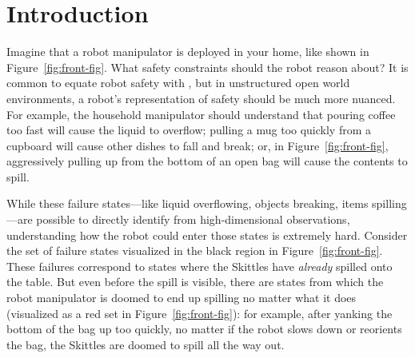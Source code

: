 \section{Introduction}
Imagine that a robot manipulator is deployed in your home, like shown in Figure~\ref{fig:front-fig}. 
What safety constraints should the robot reason about? 
It is common to equate robot safety with , but in unstructured open world environments, a robot's representation of safety should be much more nuanced. For example, the household manipulator should understand that pouring coffee too fast will cause the liquid to overflow; pulling a mug too quickly from a cupboard will cause other dishes to fall and break; or, in Figure~\ref{fig:front-fig}, aggressively pulling up from the bottom of an open bag will cause the contents to spill. 


While these failure states---like liquid overflowing, objects breaking, items spilling---are possible to directly identify from high-dimensional observations, understanding how the robot could enter those states is extremely hard. 
Consider the set of failure states visualized in the black region in Figure~\ref{fig:front-fig}. These failures correspond to states where the Skittles have \textit{already} spilled onto the table. 
But even before the spill is visible, there are states from which the robot manipulator is doomed to end up spilling no matter what it does (visualized as a red set in Figure~\ref{fig:front-fig}): for example, after yanking the bottom of the bag up too quickly, no matter if the robot slows down or reorients the bag, the Skittles are doomed to spill all the way out.

